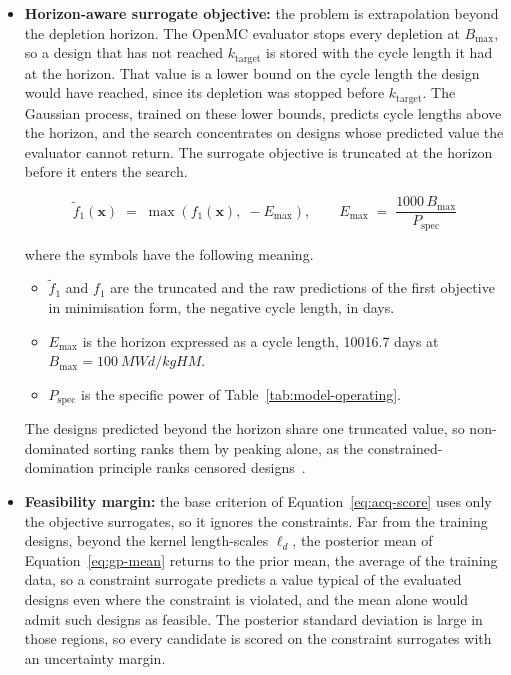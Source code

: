 \begin{itemize}
  \item \textbf{Horizon-aware surrogate objective:} the problem is
        extrapolation beyond the depletion horizon. The OpenMC
        evaluator stops every depletion at $B_\mathrm{max}$, so a
        design that has not reached $k_\mathrm{target}$ is stored with the
        cycle length it had at the horizon. That value is a lower bound
        on the cycle length the design would have reached, since its
        depletion was stopped before $k_\mathrm{target}$. The Gaussian
        process, trained on these lower bounds, predicts cycle lengths
        above the horizon, and the search concentrates on designs whose
        predicted value the evaluator cannot return. The surrogate objective is truncated at the horizon
        before it enters the search.

        \begin{equation}
        \tilde{f}_1(\mathbf{x}) \;=\;
        \max\!\left( f_1(\mathbf{x}),\; -E_\mathrm{max} \right),
        \qquad
        E_\mathrm{max} \;=\; \frac{1000\, B_\mathrm{max}}{P_\mathrm{spec}}
        \label{eq:efpd-clip}
        \end{equation}

        \noindent where the symbols have the following meaning.

        \begin{itemize}
          \item $\tilde{f}_1$ and $f_1$ are the truncated and the raw
                predictions of the first objective in minimisation form,
                the negative cycle length, in days.
          \item $E_\mathrm{max}$ is the horizon expressed as a cycle
                length, \num{10016.7} days at
                $B_\mathrm{max} = \SI{100}{MWd/kgHM}$.
          \item $P_\mathrm{spec}$ is the specific power of
                Table~\ref{tab:model-operating}.
        \end{itemize}

        The designs predicted beyond the horizon share one truncated
        value, so non-dominated sorting ranks them by peaking alone, as
        the constrained-domination principle ranks censored
        designs~\cite{deb_nsga2_2002}.

  \item \textbf{Feasibility margin:} the base criterion of
        Equation~\eqref{eq:acq-score} uses only the objective
        surrogates, so it ignores the constraints. Far from the training
        designs, beyond the kernel length-scales $\ell_d$, the posterior
        mean of Equation~\eqref{eq:gp-mean} returns to the prior mean,
        the average of the training data, so a constraint surrogate
        predicts a value typical of the evaluated designs even where the
        constraint is violated, and the mean alone would admit such
        designs as feasible. The posterior standard deviation is large in
        those regions, so every candidate is scored on
        the constraint surrogates with an uncertainty margin.


\end{itemize}
